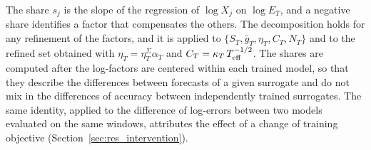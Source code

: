 The share $s_j$ is the slope of the regression of $\log X_j$ on $\log E_T$, and a negative share identifies a factor that compensates the others. The decomposition holds for any refinement of the factors, and it is applied to $\{S_T,\bar g_T,\eta_T,C_T,N_T\}$ and to the refined set obtained with $\eta_T=\eta^\Sigma_T\alpha_T$ and $C_T=\kappa_T\,T_{\rm eff}^{-1/2}$. The shares are computed after the log-factors are centered within each trained model, so that they describe the differences between forecasts of a given surrogate and do not mix in the differences of accuracy between independently trained surrogates. The same identity, applied to the difference of log-errors between two models evaluated on the same windows, attributes the effect of a change of training objective (Section~\ref{sec:res_intervention}).
